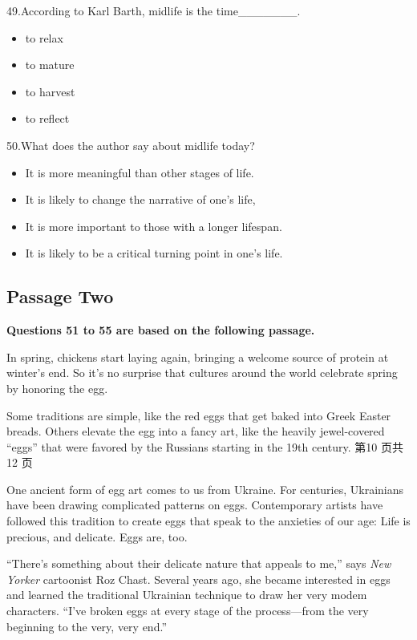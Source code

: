 \documentclass[UTF8,11pt]{ctexart}
\begin{document}
49.According to Karl Barth, midlife is the time\_\_\_\_\_\_\_.


\begin{itemize}[leftmargin=2em,itemsep=.2em,topsep=.4em]\item[A.] to relax
\item[B.] to mature
\item[C.] to harvest
\item[D.] to reflect
\end{itemize}

50.What does the author say about midlife today?


\begin{itemize}[leftmargin=2em,itemsep=.2em,topsep=.4em]\item[A.] It is more meaningful than other stages of life.
\item[B.] It is likely to change the narrative of one’s life,
\item[C.] It is more important to those with a longer lifespan.
\item[D.] It is likely to be a critical turning point in one’s life.
\end{itemize}

\subsection*{\textbf{Passage Two}}


\textbf{Questions 51 to 55 are based on the following passage.}


In spring, chickens start laying again, bringing a welcome source of protein at winter’s end. So it’s no surprise that cultures around the world celebrate spring by honoring the egg.


Some traditions are simple, like the red eggs that get baked into Greek Easter breads. Others elevate the egg into a fancy art, like the heavily jewel-covered “eggs” that were favored by the Russians starting in the 19th century. 第10 页共12 页


One ancient form of egg art comes to us from Ukraine. For centuries, Ukrainians have been drawing complicated patterns on eggs. Contemporary artists have followed this tradition to create eggs that speak to the anxieties of our age: Life is precious, and delicate. Eggs are, too.


“There’s something about their delicate nature that appeals to me,” says\textit{ New Yorker} cartoonist Roz Chast. Several years ago, she became interested in eggs and learned the traditional Ukrainian technique to draw her very modem characters. “I’ve broken eggs at every stage of the process—from the very beginning to the very, very end.”
\end{document}
